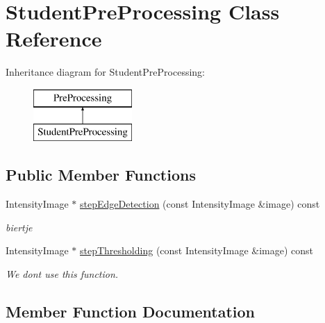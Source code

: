\hypertarget{class_student_pre_processing}{}\section{Student\+Pre\+Processing Class Reference}
\label{class_student_pre_processing}
Inheritance diagram for Student\+Pre\+Processing\+:\begin{figure}[H]
\begin{center}
\leavevmode
\includegraphics[height=2.000000cm]{class_student_pre_processing}
\end{center}
\end{figure}
\subsection*{Public Member Functions}
\begin{DoxyCompactItemize}
\item 
\mbox{\label{class_student_pre_processing_ab41148b8a4701cda08e67d2ad4a61747}} 
Intensity\+Image $\ast$ \mbox{\hyperlink{class_student_pre_processing_ab41148b8a4701cda08e67d2ad4a61747}{step\+Edge\+Detection}} (const Intensity\+Image \&image) const
\begin{DoxyCompactList}\small\item\em biertje \end{DoxyCompactList}\item 
Intensity\+Image $\ast$ \mbox{\hyperlink{class_student_pre_processing_a7e16ec24f25b582dfd9d2de63ce664e6}{step\+Thresholding}} (const Intensity\+Image \&image) const
\begin{DoxyCompactList}\small\item\em We don\textquotesingle{}t use this function. \end{DoxyCompactList}\end{DoxyCompactItemize}


\subsection{Member Function Documentation}
\mbox{\label{class_student_pre_processing_a7e16ec24f25b582dfd9d2de63ce664e6}} 
